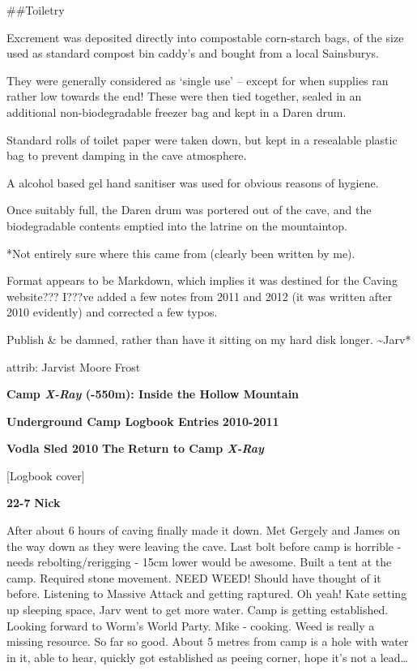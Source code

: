 \#\#Toiletry

Excrement was deposited directly into compostable corn-starch bags, of
the size used as standard compost bin caddy's and bought from a local
Sainsburys.

They were generally considered as `single use' -- except for when
supplies ran rather low towards the end! These were then tied together,
sealed in an additional non-biodegradable freezer bag and kept in a
Daren drum.

Standard rolls of toilet paper were taken down, but kept in a resealable
plastic bag to prevent damping in the cave atmosphere.

A alcohol based gel hand sanitiser was used for obvious reasons of
hygiene.

Once suitably full, the Daren drum was portered out of the cave, and the
biodegradable contents emptied into the latrine on the mountaintop.

*Not entirely sure where this came from (clearly been written by me).

Format appears to be Markdown, which implies it was destined for the
Caving website??? I???ve added a few notes from 2011 and 2012 (it was
written after 2010 evidently) and corrected a few typos.

Publish \& be damned, rather than have it sitting on my hard disk
longer. \textasciitilde{}Jarv*

attrib: Jarvist Moore Frost

\textbf{Camp \emph{X-Ray} (-550m): Inside the Hollow Mountain}

\textbf{Underground Camp Logbook Entries} \textbf{2010-2011}

\textbf{Vodla Sled 2010} \textbf{The} \textbf{Return to Camp
\emph{X-Ray}}

{[}Logbook cover{]}

\textbf{22-7} \textbf{Nick}

After about 6 hours of caving finally made it down. Met Gergely and
James on the way down as they were leaving the cave. Last bolt before
camp is horrible - needs rebolting/rerigging - 15cm lower would be
awesome. Built a tent at the camp. Required stone movement. NEED WEED!
Should have thought of it before. Listening to Massive Attack and
getting raptured. Oh yeah! Kate setting up sleeping space, Jarv went to
get more water. Camp is getting established. Looking forward to Worm's
World Party. Mike - cooking. Weed is really a missing resource. So far
so good. About 5 metres from camp is a hole with water in it, able to
hear, quickly got established as peeing corner, hope it's not a
lead\ldots{}

